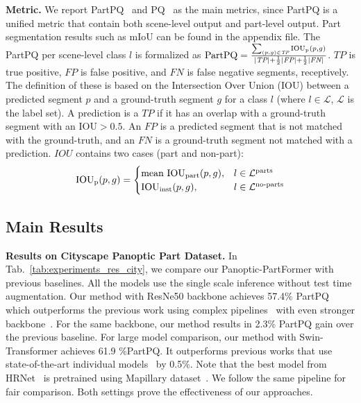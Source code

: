 \noindent
\textbf{Metric.}
We report PartPQ~\cite{degeus2021panopticparts} and PQ~\cite{kirillov2019panoptic} as the main metrics, since PartPQ is a unified metric that contain both scene-level output and part-level output. Part segmentation results such as mIoU can be found in the appendix file. The PartPQ per scene-level class $l$ is formalized as $\textrm{PartPQ} = \frac{\sum_{(p,g) \in \textit{TP}}\textrm{IOU\textsubscript{p}}(p,g)}{|\textit{TP}| + \frac{1}{2}|\textit{FP}|+ \frac{1}{2}|\textit{FN}|}$. ${TP}$ is true positive, ${FP}$ is false positive, and ${FN}$ is false negative segments, receptively. The definition of these is based on the Intersection Over Union (IOU) between a predicted segment $p$ and a ground-truth segment $g$ for a class $l$ (where $l \in \mathcal{L}$, $\mathcal{L}$ is the label set). A prediction is a ${TP}$ if it has an overlap with a ground-truth segment with an $\textrm{IOU} > 0.5$. An ${FP}$ is a predicted segment that is not matched with the ground-truth, and an ${FN}$ is a ground-truth segment not matched with a prediction. $IOU$ contains two cases (part and non-part): 
$$ \textrm{IOU\textsubscript{p}}(p,g) =
    \begin{cases}
      \textrm{mean IOU\textsubscript{part}}(p,g), & \textrm{$l \in \mathcal{L}^\text{parts}$}\\
      \textrm{IOU\textsubscript{inst}}(p,g), & \textrm{$l \in \mathcal{L}^\text{no-parts}$}
    \end{cases} $$



\subsection{Main Results}

\noindent
\textbf{Results on Cityscape Panoptic Part Dataset.} In Tab.~\ref{tab:experiments_res_city}, we compare our Panoptic-PartFormer with previous baselines. All the models use the single scale inference without test time augmentation. Our method with ResNe50 backbone achieves 57.4\% PartPQ which outperforms the previous work using complex pipelines~\cite{deeplabv3plus,maskrcnn} with even stronger backbone~\cite{chollet2017xception}. For the same backbone, our method results in 2.3\% PartPQ gain over the previous baseline. 
For large model comparison, our method with Swin-Transformer achieves 61.9 \%PartPQ. It outperforms previous works that use state-of-the-art individual models~\cite{ocrnet,wang2020deep,Zhao2019BSANet,liang2020polytransform} by 0.5\%. Note that the best model from HRNet~\cite{ocrnet} is pretrained using Mapillary dataset~\cite{neuhold2017mapillary}.
We follow the same pipeline for fair comparison. Both settings prove the effectiveness of our approaches.

